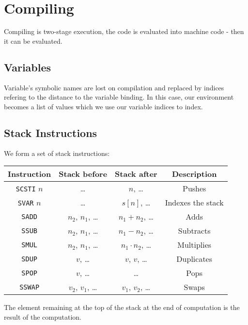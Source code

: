 \section{Compiling}

Compiling is two-stage execution, the code is evaluated
into machine code - then it can be evaluated.

\subsection{Variables}

Variable's symbolic names are lost on compilation and 
replaced by indices refering to the distance to the variable
binding. In this case, our environment becomes a list of values
which we use our variable indices to index.

\subsection{Stack Instructions}

We form a set of stack instructions:
\begin{center}
    \begin{tabular}{| c | c | c | c |}
        \hline
        Instruction & Stack before & Stack after & Description \\
        \hline \hline
        \texttt{SCSTI} $n$ & \ldots               & $n$, \ldots             & Pushes \\
        \hline
        \texttt{SVAR} $n$  & \ldots               & $s[n]$, \ldots          & Indexes the stack \\
        \hline
        \texttt{SADD}      & $n_2$, $n_1$, \ldots & $n_1 + n_2$, \ldots     & Adds \\
        \hline
        \texttt{SSUB}      & $n_2$, $n_1$, \ldots & $n_1 - n_2$, \ldots     & Subtracts \\
        \hline
        \texttt{SMUL}      & $n_2$, $n_1$, \ldots & $n_1 \cdot n_2$, \ldots & Multiplies \\
        \hline
        \texttt{SDUP}      & $v$, \ldots          & $v$, $v$, \ldots        & Duplicates \\
        \hline
        \texttt{SPOP}      & $v$, \ldots          & \ldots                  & Pops \\
        \hline
        \texttt{SSWAP}     & $v_2$, $v_1$, \ldots & $v_1$, $v_2$, \ldots    & Swaps \\
        \hline
    \end{tabular}
\end{center} The element remaining at the top of the stack at
the end of computation is the result of the computation.